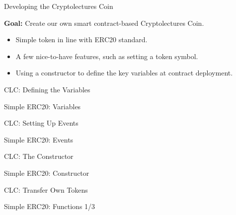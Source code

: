 \documentclass[handout]{beamer}
\begin{document}
\begin{frame}{Developing the Cryptolectures Coin}

\textbf{Goal: }Create our own smart contract-based Cryptolectures Coin.
\vspace{1.5em}

\centering
	\begin{tikzpicture}[scale=1.5, every node/.style={scale=1.5}]
			
	\end{tikzpicture}

\vspace{1em}
\begin{itemize}
	\item Simple token in line with ERC20 standard.
	\item A few nice-to-have features, such as setting a token symbol.
	\item Using a constructor to define the key variables at contract deployment.
\end{itemize}


\end{frame}

\begin{frame}{CLC: Defining the Variables}

	\begin{samplecode}{Simple ERC20: Variables}
		
	\end{samplecode}

\end{frame}


\begin{frame}{CLC: Setting Up Events}

	\begin{samplecode}{Simple ERC20: Events}
		
	\end{samplecode}

\end{frame}

\begin{frame}{CLC: The Constructor}

	\begin{samplecode}{Simple ERC20: Constructor}
		
	\end{samplecode}

\end{frame}

\begin{frame}{CLC: Transfer Own Tokens}

	\begin{samplecode}{Simple ERC20: Functions 1/3}
		
	\end{samplecode}

\end{frame}
\end{document}
